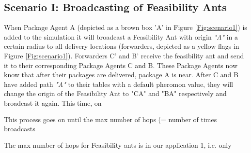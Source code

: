 \subsection*{Scenario I: Broadcasting of Feasibility Ants}
\label{subsec:scenario1}

When Package Agent A (depicted as a brown box 'A' in Figure \ref{Fig:scenario1})
is added to the simulation it will broadcast a Feasibility Ant with origin
\emph{"A"} in a certain radius to all delivery locations (forwarders, depicted
as a yellow flags in Figure \ref{Fig:scenario1}). Forwarders C' and B' receive
the feasibility ant and send it to their corresponding Package Agents C and B.
These Package Agents now know that after their packages are delivered, package A
is near. After C and B have added path \emph{"A"} to their tables with a default
pheromon value, they will change the origin of the Feasibility Ant to "CA" and
"BA" respectively and broadcast it again. This time, on

This process goes on until the max number of hops (= number of times broadcasts

\npar The max number of hops for Feasibility ants is in our application 1, i.e. only


